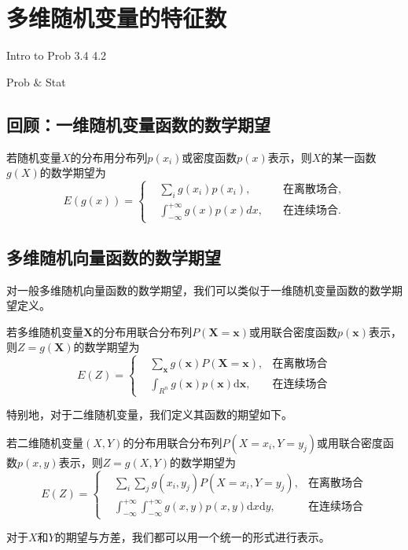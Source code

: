 \chapter{多维随机变量的特征数}
\begin{introduction}
  \item Intro to Prob 3.4 4.2
  \item Prob $\&$ Stat
\end{introduction}
\section{回顾：一维随机变量函数的数学期望}
    若随机变量$X$的分布用分布列$p(x_i)$或密度函数$p(x)$表示，则$X$的某一函数$g(X)$的数学期望为
$$E(g(x))=\left\{\begin{aligned}
&\sum_{i} g\left(x_{i}\right) p\left(x_{i}\right), &\quad \text{在离散场合}, \\
&\int_{-\infty}^{+\infty} g(x) p(x) d x, &\quad \text{在连续场合}. 
\end{aligned}\right.$$

\section{多维随机向量函数的数学期望}
对一般多维随机向量函数的数学期望，我们可以类似于一维随机变量函数的数学期望定义。
\begin{theorem}
若多维随机变量$\bm{X}$的分布用联合分布列$P(\bm{X}=\bm{x})$或用联合密度函数$p(\bm{x})$表示，则$Z=g(\bm{X})$的数学期望为
$$E(Z)=\left\{
\begin{aligned}
    &\sum_{\bm{x}}  g\left(\bm{x}\right) P\left(\bm{X}=\bm{x}\right), & \text{在离散场合} \\
&\int_{R^n}  g(\bm{x}) p(\bm{x}) \text{d} \bm{x} , & \text{在连续场合}
\end{aligned}\right.$$
\end{theorem}
特别地，对于二维随机变量，我们定义其函数的期望如下。
\begin{theorem}
若二维随机变量$(X,Y)$的分布用联合分布列$P(X=x_{i},Y=y_{j})$或用联合密度函数$p(x,y)$表示，则$Z=g(X,Y)$的数学期望为
$$E(Z)=\left\{
\begin{aligned}
    &\sum_{i}  \sum_{j} g\left(x_{i}, y_{j}\right) P\left(X=x_{i}, Y=y_{j}\right), & \text{在离散场合} \\
&\int_{-\infty}^{+\infty} \int_{-\infty}^{+\infty} g(x, y) p(x, y) \text{d} x \text{d} y,& \text{在连续场合}
\end{aligned}\right.$$
\end{theorem}
对于$X$和$Y$的期望与方差，我们都可以用一个统一的形式进行表示。


